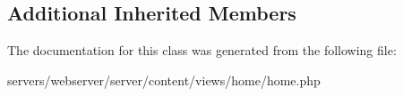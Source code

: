 \subsection*{Additional Inherited Members}


The documentation for this class was generated from the following file\+:\begin{DoxyCompactItemize}
\item 
servers/webserver/server/content/views/home/home.\+php\end{DoxyCompactItemize}
